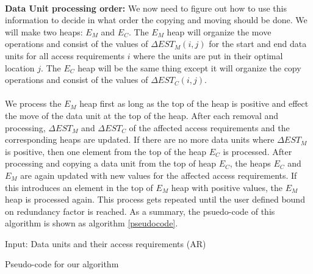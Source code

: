 \\
{\bf Data Unit processing order:} We now need to figure out how to use this
information to decide in what order the copying and moving should be done. We will make two heaps: $E_M$ and $E_C$. The $E_M$ heap will organize the move operations and consist of the values of $\Delta EST_M(i,j)$ for the start and end data units for all access requirements $i$ where the units are put in their optimal location $j$. The $E_C$ heap will be the same thing except it will organize the copy operations and consist of the values of $\Delta EST_C(i,j)$.\\
\\
We process the $E_M$ heap first as long as the top of the heap is positive and effect the move of the data unit at the top of the heap. After each removal and processing, $\Delta EST_M$ and $\Delta EST_C$ of the affected access requirements and the corresponding heaps are updated. If there are no more data units where $\Delta EST_M$ is positive, then one element from the top of the heap $E_C$ is processed. After processing and copying a data unit from the top of heap $E_C$, the heaps $E_C$ and $E_M$ are again updated with new values for the affected access requirements. If this introduces an element in the top of $E_M$ heap with positive values, the $E_M$ heap is processed again. This process gets repeated until the user defined bound on redundancy factor is reached. As a summary, the psuedo-code of this algorithm is shown as algorithm \ref{pseudocode}.

\begin{algorithm}[t]
Input: Data units and their access requirements (AR) \;
\caption{Pseudo-code for our algorithm}
\label{pseudocode}
\end{algorithm}

